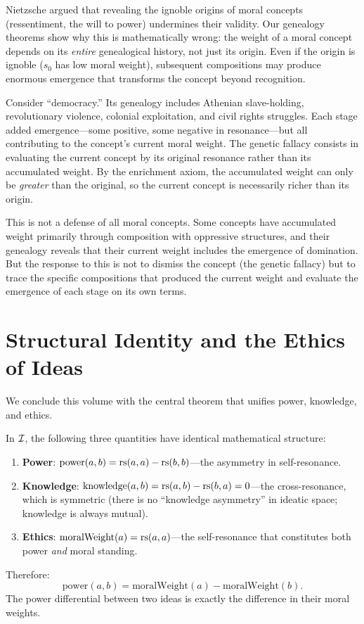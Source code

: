 \begin{interpretation}
Nietzsche argued that revealing the ignoble origins of moral concepts
(ressentiment, the will to power) undermines their validity. Our
genealogy theorems show why this is mathematically wrong: the weight
of a moral concept depends on its \emph{entire} genealogical history,
not just its origin. Even if the origin is ignoble ($s_0$ has low moral
weight), subsequent compositions may produce enormous emergence that
transforms the concept beyond recognition.

Consider ``democracy.'' Its genealogy includes Athenian slave-holding,
revolutionary violence, colonial exploitation, and civil rights
struggles. Each stage added emergence---some positive, some negative in
resonance---but all contributing to the concept's current moral weight.
The genetic fallacy consists in evaluating the current concept by its
original resonance rather than its accumulated weight. By the enrichment
axiom, the accumulated weight can only be \emph{greater} than the
original, so the current concept is necessarily richer than its origin.

This is not a defense of all moral concepts. Some concepts have
accumulated weight primarily through composition with oppressive
structures, and their genealogy reveals that their current weight
includes the emergence of domination. But the response to this is not
to dismiss the concept (the genetic fallacy) but to trace the specific
compositions that produced the current weight and evaluate the emergence
of each stage on its own terms.
\end{interpretation}

\section{Structural Identity and the Ethics of Ideas}
\label{sec:structural-identity}

We conclude this volume with the central theorem that unifies power,
knowledge, and ethics.

\begin{theorem}
\label{thm:structural-identity}
In $\mathcal{I}$, the following three quantities have identical mathematical structure:
\begin{enumerate}
\item \textbf{Power}: $\mathrm{power}(a,b) = \mathrm{rs}(a,a) - \mathrm{rs}(b,b)$---the
asymmetry in self-resonance.
\item \textbf{Knowledge}: $\mathrm{knowledge}(a,b) = \mathrm{rs}(a,b) - \mathrm{rs}(b,a) = 0$---the
cross-resonance, which is symmetric (there is no ``knowledge asymmetry''
in ideatic space; knowledge is always mutual).
\item \textbf{Ethics}: $\mathrm{moralWeight}(a) = \mathrm{rs}(a,a)$---the
self-resonance that constitutes both power \emph{and} moral standing.
\end{enumerate}
Therefore:
\[
  \mathrm{power}(a,b) = \mathrm{moralWeight}(a) - \mathrm{moralWeight}(b).
\]
The power differential between two ideas is exactly the difference in their
moral weights.
\end{theorem}

